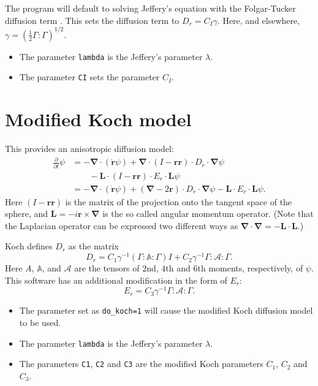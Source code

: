 \documentclass{amsart}
\newcommand{\br}{{\mathbf r}}
\newcommand{\bnabla}{{\boldsymbol \nabla}}
\begin{document}
\noindent
The program will default to solving Jeffery's equation with the Folgar-Tucker diffusion term \cite{folgar}.  This sets the diffusion term to $ D_r = C_I \gamma $.
Here, and elsewhere, $\gamma = \left(\frac12\Gamma:\Gamma\right)^{1/2}$.
\begin{itemize}
\item The parameter {\tt lambda} is the Jeffery's parameter $\lambda$.
\item The parameter {\tt CI} sets the parameter $C_I$.
\end{itemize}

\section*{Modified Koch model}

\noindent
This provides an anisotropic diffusion model:
\begin{align*}
\frac\partial{\partial t}\psi &= - \bnabla\cdot(\dot\br \psi) + \bnabla\cdot(I-\br\br)\cdot D_r\cdot\bnabla\psi \\
&\qquad - \mathbf L\cdot(I-\br\br)\cdot E_r\cdot\mathbf L \psi \\
& = - \bnabla\cdot(\dot\br \psi) + (\bnabla-2\br)\cdot D_r\cdot\bnabla\psi - \mathbf L \cdot E_r \cdot \mathbf L \psi .
\end{align*}
Here $(I-\br\br)$ is the matrix of the projection onto the tangent space of the sphere, and $\mathbf L = -i \br \times \bnabla$ is the so called angular momentum operator.  (Note that the Laplacian operator can be expressed two different ways as $\bnabla\cdot\bnabla = -\mathbf L \cdot \mathbf L$.)

Koch \cite{koch} defines $D_r$ as the matrix
$$ D_r = C_1 \gamma^{-1} (\Gamma: \mathbb A:\Gamma) I + C_2 \gamma^{-1} \Gamma: \mathcal A:\Gamma .$$
Here $A$, $\mathbb A$, and $\mathcal A$ are the tensors of $2$nd, $4$th and $6$th moments, respectively, of $\psi$.  This software has an additional modification in the form of $E_r$:
$$ E_r = C_3 \gamma^{-1} \Gamma: \mathcal A:\Gamma .$$
\begin{itemize}
\item The parameter set as {\tt do\_koch=1} will cause the modified Koch diffusion model to be used.
\item The parameter {\tt lambda} is the Jeffery's parameter $\lambda$.
\item The parameters {\tt C1}, {\tt C2} and {\tt C3} are the modified Koch parameters $C_1$, $C_2$ and $C_3$.
\end{itemize}
\end{document}
